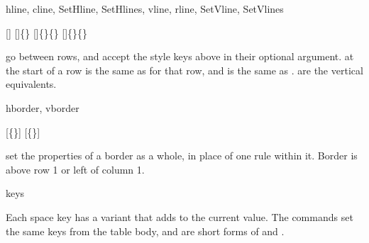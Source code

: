 \begin{codedescribe}[code]{hline, cline, SetHline, SetHlines, vline, rline, SetVline, SetVlines}
  \begin{codesyntax}
    []
    []\{\}
    []\{\}\{\}
    []\{\}\{\}
  \end{codesyntax}
   go between rows, and accept the style keys above in their optional argument.  at the start of a row is the same as  for that row, and  is the same as .  are the vertical equivalents.
\end{codedescribe}

\begin{codedescribe}[keys]{hborder, vborder}
  \begin{codesyntax}
    [\{\}]
    [\{\}]
  \end{codesyntax}
   set the properties of a border as a whole, in place of one rule within it. Border  is above row 1 or left of column 1.
  \begin{describelist*}[24mm]{keys}
    \begin{tsremark}
      Each space key has a \key[no index]{+} variant that adds to the current value. The commands  set the same keys from the table body, and  are short forms of  and .
    \end{tsremark}
  \end{describelist*}
\end{codedescribe}

